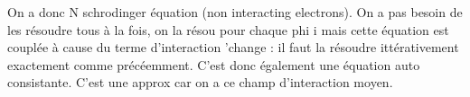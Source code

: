 On a donc N schrodinger équation (non interacting electrons).  On a pas besoin de les résoudre tous à la fois, on la 
résou pour chaque phi i mais cette équation est couplée à cause du terme d'interaction 'change : il faut la résoudre 
ittérativement exactement comme précéemment. C'est donc également une équation auto consistante. C'est une approx 
car on a ce champ d'interaction moyen.